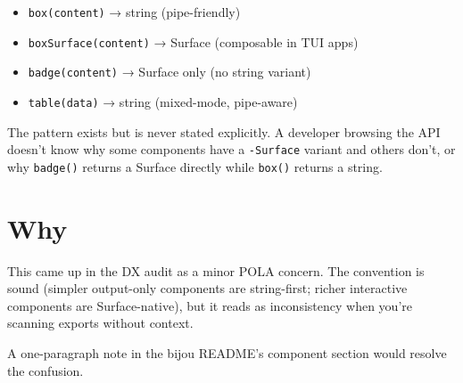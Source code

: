 \begin{itemize}
\tightlist
\item
  \texttt{b\allowbreak{}o\allowbreak{}x\allowbreak{}(\allowbreak{}c\allowbreak{}o\allowbreak{}n\allowbreak{}t\allowbreak{}e\allowbreak{}n\allowbreak{}t\allowbreak{})} → string (pipe-friendly)
\item
  \texttt{b\allowbreak{}o\allowbreak{}x\allowbreak{}S\allowbreak{}u\allowbreak{}r\allowbreak{}f\allowbreak{}a\allowbreak{}c\allowbreak{}e\allowbreak{}(\allowbreak{}c\allowbreak{}o\allowbreak{}n\allowbreak{}t\allowbreak{}e\allowbreak{}n\allowbreak{}t\allowbreak{})} → Surface (composable in TUI apps)
\item
  \texttt{b\allowbreak{}a\allowbreak{}d\allowbreak{}g\allowbreak{}e\allowbreak{}(\allowbreak{}c\allowbreak{}o\allowbreak{}n\allowbreak{}t\allowbreak{}e\allowbreak{}n\allowbreak{}t\allowbreak{})} → Surface only (no string variant)
\item
  \texttt{t\allowbreak{}a\allowbreak{}b\allowbreak{}l\allowbreak{}e\allowbreak{}(\allowbreak{}d\allowbreak{}a\allowbreak{}t\allowbreak{}a\allowbreak{})} → string (mixed-mode, pipe-aware)
\end{itemize}

The pattern exists but is never stated explicitly. A developer browsing the API doesn't know why some components have a \texttt{-\allowbreak{}S\allowbreak{}u\allowbreak{}r\allowbreak{}f\allowbreak{}a\allowbreak{}c\allowbreak{}e} variant and others don't, or why \texttt{b\allowbreak{}a\allowbreak{}d\allowbreak{}g\allowbreak{}e\allowbreak{}(\allowbreak{})} returns a Surface directly while \texttt{b\allowbreak{}o\allowbreak{}x\allowbreak{}(\allowbreak{})} returns a string.

\section{Why}\label{record-344-why}

This came up in the DX audit as a minor POLA concern. The convention is sound (simpler output-only components are string-first; richer interactive components are Surface-native), but it reads as inconsistency when you're scanning exports without context.

A one-paragraph note in the bijou README's component section would resolve the confusion.

